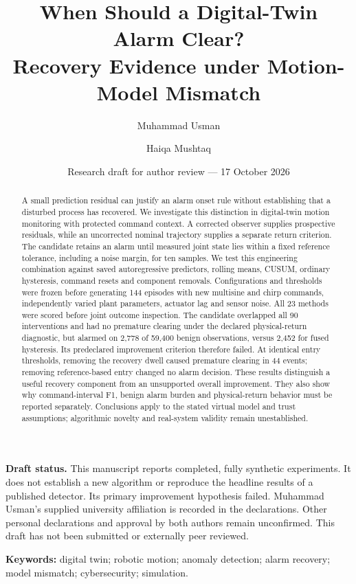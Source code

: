 \documentclass[11pt,a4paper]{article}
\title{When Should a Digital-Twin Alarm Clear?\\Recovery Evidence under Motion-Model Mismatch}
\author{Muhammad Usman \and Haiqa Mushtaq}
\date{Research draft for author review --- 17 October 2026}
\begin{document}
\maketitle
\noindent\textbf{Draft status.} This manuscript reports completed, fully synthetic experiments. It does not establish a new algorithm or reproduce the headline results of a published detector. Its primary improvement hypothesis failed. Muhammad Usman's supplied university affiliation is recorded in the declarations. Other personal declarations and approval by both authors remain unconfirmed. This draft has not been submitted or externally peer reviewed.
\begin{abstract}
A small prediction residual can justify an alarm onset rule without establishing that a disturbed process has recovered. We investigate this distinction in digital-twin motion monitoring with protected command context. A corrected observer supplies prospective residuals, while an uncorrected nominal trajectory supplies a separate return criterion. The candidate retains an alarm until measured joint state lies within a fixed reference tolerance, including a noise margin, for ten samples. We test this engineering combination against saved autoregressive predictors, rolling means, CUSUM, ordinary hysteresis, command resets and component removals. Configurations and thresholds were frozen before generating 144 episodes with new multisine and chirp commands, independently varied plant parameters, actuator lag and sensor noise. All 23 methods were scored before joint outcome inspection. The candidate overlapped all 90 interventions and had no premature clearing under the declared physical-return diagnostic, but alarmed on 2,778 of 59,400 benign observations, versus 2,452 for fused hysteresis. Its predeclared improvement criterion therefore failed. At identical entry thresholds, removing the recovery dwell caused premature clearing in 44 events; removing reference-based entry changed no alarm decision. These results distinguish a useful recovery component from an unsupported overall improvement. They also show why command-interval F1, benign alarm burden and physical-return behavior must be reported separately. Conclusions apply to the stated virtual model and trust assumptions; algorithmic novelty and real-system validity remain unestablished.
\end{abstract}
\noindent\textbf{Keywords:} digital twin; robotic motion; anomaly detection; alarm recovery; model mismatch; cybersecurity; simulation.





\clearpage
\appendix

\clearpage


\end{document}
